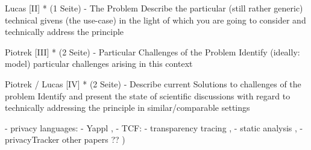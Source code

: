 Lucas 
[II] * (1 Seite) - The Problem 
Describe the particular (still rather generic) technical givens (the use-case) in the light of which you are going to consider and technically address the principle




Piotrek
[III] * (2 Seite) - Particular Challenges of the Problem
Identify (ideally: model) particular challenges arising in this context




Piotrek / Lucas
[IV] * (2 Seite) - Describe current Solutions to challenges of the problem 
Identify and present the state of scientific discussions with regard to technically addressing the principle in similar/comparable settings

 - privacy languages: 
     - Yappl \cite{Ulbricht2018YaPPLScenarios},
     - TCF: \cite{2019IABFramework-Policies}
 - transparency tracing \cite{ErnstTransparencyComputing},
 - static analysis \cite{Spoto2018StaticCompliance},
 - privacyTracker \cite{2016PrivacyTracker:Controls}
 other papers ?? )


